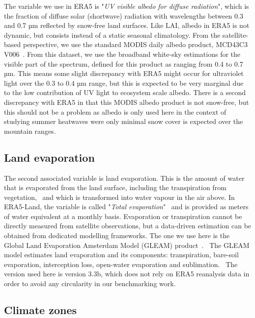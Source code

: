 \documentclass[gmd, manuscript]{copernicus}
\begin{document}
The variable we use in ERA5 is "\emph{UV visible albedo for diffuse radiation}", which is the fraction of diffuse solar (shortwave) radiation with wavelengths between 0.3 and 0.7 µm reflected by snow-free land surfaces. Like LAI, albedo in ERA5 is not dynamic, but consists instead of a static seasonal climatology. From the satellite-based perspective, 
we use the standard MODIS daily albedo product, MCD43C3 V006~\citep{Schaaf_2015}. From this
dataset, we use the broadband white-sky estimations for the visible part
of the spectrum, defined for this product as ranging from 0.4 to 0.7 µm. This means some slight discrepancy with ERA5 might occur for
ultraviolet light over the 0.3 to 0.4 µm range, but this is expected to be very marginal due to the low contribution of UV light to ecosystem
scale albedo. There is a second discrepancy with ERA5 in that this MODIS albedo product is not snow-free, but this should not be a problem as albedo is only used here in the context of studying summer heatwaves were only minimal snow cover is expected over the mountain ranges.


\subsection{Land evaporation}


The second associated variable is land evaporation. This is the amount
of water that is evaporated from the land surface, including the
transpiration from vegetation,~ and which is transformed into water
vapour in the air above. In ERA5-Land, the variable is called
"\emph{Total evaporation}"~ and is provided as meters of water
equivalent at a monthly basis. Evaporation or transpiration cannot be
directly measured from satellite observations, but a data-driven
estimation can be obtained from dedicated modelling frameworks. The one
we use here is the Global Land Evaporation Amsterdam Model (GLEAM)
product~\citep{Martens_2017,Miralles_2011}.~ The GLEAM model estimates land evaporation
and its components: transpiration, bare-soil evaporation, interception
loss, open-water evaporation and sublimation.~ The version used here is
version 3.3b, which does not rely on ERA5 reanalysis data in order to
avoid any circularity in our benchmarking work.


\subsection{Climate zones}
\end{document}
